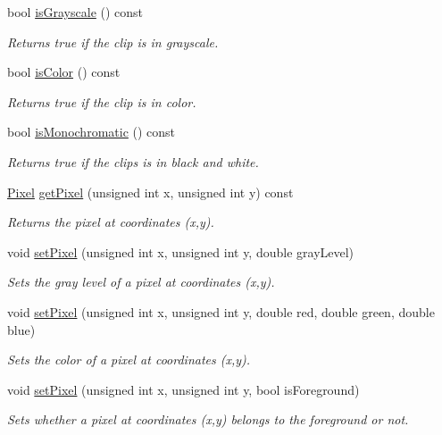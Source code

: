 \begin{CompactItemize}
bool \hyperlink{class_clip_6f8d3a88f89461350228f5e7b7b9d694}{isGrayscale} () const 
\begin{CompactList}\small\item\em Returns true if the clip is in grayscale. \item\end{CompactList}\item 
bool \hyperlink{class_clip_0a535167abd0a544a2de56c317bb6f3c}{isColor} () const 
\begin{CompactList}\small\item\em Returns true if the clip is in color. \item\end{CompactList}\item 
bool \hyperlink{class_clip_5045f79876d4299b54803d56b26d5f75}{isMonochromatic} () const 
\begin{CompactList}\small\item\em Returns true if the clips is in black and white. \item\end{CompactList}\item 
\hyperlink{class_pixel}{Pixel} \hyperlink{class_clip_74eded11c0dcbd2b10b453074cbb8b84}{getPixel} (unsigned int x, unsigned int y) const 
\begin{CompactList}\small\item\em Returns the pixel at coordinates (x,y). \item\end{CompactList}\item 
void \hyperlink{class_clip_3c48493242de7453438ed0e8d0ea74df}{setPixel} (unsigned int x, unsigned int y, double grayLevel)
\begin{CompactList}\small\item\em Sets the gray level of a pixel at coordinates (x,y). \item\end{CompactList}\item 
void \hyperlink{class_clip_1e28a9ed2676460de4b5b9ab1b985f4c}{setPixel} (unsigned int x, unsigned int y, double red, double green, double blue)
\begin{CompactList}\small\item\em Sets the color of a pixel at coordinates (x,y). \item\end{CompactList}\item 
void \hyperlink{class_clip_9e78d68c58016aaff8c65ddac29ed07f}{setPixel} (unsigned int x, unsigned int y, bool isForeground)
\begin{CompactList}\small\item\em Sets whether a pixel at coordinates (x,y) belongs to the foreground or not. \item\end{CompactList}\end{CompactItemize}
